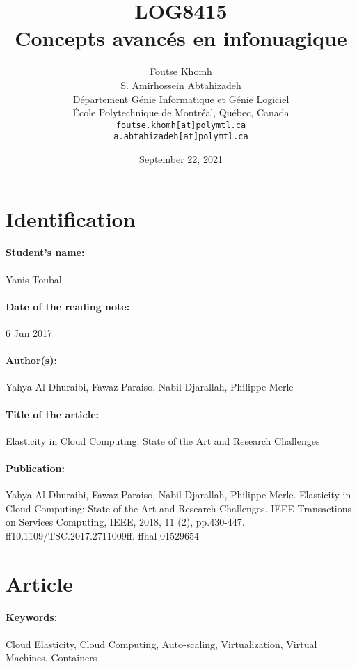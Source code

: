 \documentclass[11pt]{article}
\title{LOG8415\\Concepts avanc\'{e}s en infonuagique}
\author{
    Foutse Khomh \\
    S. Amirhossein Abtahizadeh \\
    D\'{e}partement G\'{e}nie Informatique et G\'{e}nie Logiciel \\
    \'{E}cole Polytechnique de Montr\'{e}al, Qu\'{e}bec, Canada \\
    \texttt{foutse.khomh[at]polymtl.ca} \\
    \texttt{a.abtahizadeh[at]polymtl.ca}
}
\date{September 22, 2021}
\def\titre{Elasticity in Cloud Computing: State of the Art and Research Challenges
}
\def\auteur{Yanis Toubal}
\begin{document}
\maketitle

\section{Identification}

\paragraph{Student's name:} \auteur

\paragraph{Date of the reading note:} {6 Jun 2017}

\paragraph{Author(s):} {Yahya Al-Dhuraibi, Fawaz Paraiso, Nabil Djarallah, Philippe Merle}

\paragraph{Title of the article:} \titre

\paragraph{Publication:} {Yahya Al-Dhuraibi, Fawaz Paraiso, Nabil Djarallah, Philippe Merle. Elasticity in Cloud Computing:
State of the Art and Research Challenges. IEEE Transactions on Services Computing, IEEE, 2018,
11 (2), pp.430-447. ff10.1109/TSC.2017.2711009ff. ffhal-01529654}

\section{Article}

\paragraph{Keywords:} {Cloud Elasticity, Cloud Computing, Auto-scaling, Virtualization, Virtual Machines, Containers}
\end{document}
